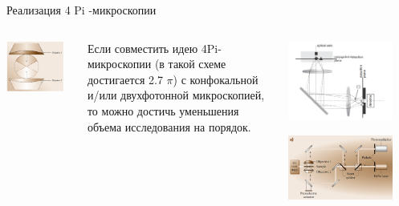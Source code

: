 \documentclass[9pt, compress, xcolor=table]{beamer}
\begin{document}
\begin{frame}{Реализация 4 Pi -микроскопии}
\begin{columns}[c]
\column{6cm}
\begin{center}
\includegraphics[width=0.9\textwidth]{ffm02}
\end{center}
{\small Если совместить идею 4Pi-микроскопии (в такой схеме достигается 2.7 $\pi$) с конфокальной и/или двухфотонной микроскопией, то можно достичь уменьшения объема исследования на порядок.}
\column{6.5cm}
\begin{center}
\includegraphics[width=0.85\textwidth]{ffm02a}

\includegraphics[width=0.85\textwidth]{ffm02b}
\end{center}
\end{columns}
\end{frame}
\end{document}

